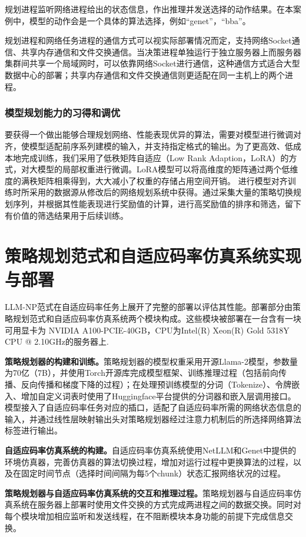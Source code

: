 规划进程监听网络进程给出的状态信息，作出推理并发送选择的动作结果。在本案例中，模型的动作会是一个具体的算法选择，例如“genet”，“bba”。

规划进程和网络任务进程的通信方式可以视实际部署情况而定，支持网络Socket通信、共享内存通信和文件交换通信。当决策进程单独运行于独立服务器上而服务器集群间共享一个局域网时，可以依靠网络Socket进行通信，这种通信方式适合大型数据中心的部署；共享内存通信和文件交换通信则更适配在同一主机上的两个进程。

\subsubsection{模型规划能力的习得和调优}
要获得一个做出能够合理规划网络、性能表现优异的算法，需要对模型进行微调对齐，使模型适配前序系列建模的输入，并支持指定格式的输出。为了更高效、低成本地完成训练，我们采用了低秩矩阵自适应（Low Rank Adaption，LoRA）的方式，对大模型的局部权重进行微调。LoRA模型可以将高维度的矩阵通过两个低维度的满秩矩阵相乘得到，大大减小了权重的存储占用空间开销。 进行模型对齐训练时所采用的数据源从修改后的网络规划系统中获得。通过采集大量的策略切换规划序列，并根据其性能表现进行奖励值的计算，进行高奖励值的排序和筛选，留下有价值的筛选结果用于后续训练。


\section{策略规划范式和自适应码率仿真系统实现与部署}
LLM-NP范式在自适应码率任务上展开了完整的部署以评估其性能。部署部分由策略规划范式和自适应码率仿真系统两个模块构成。这些模块被部署在一台含有一块可用显卡为 NVIDIA A100-PCIE-40GB，CPU为Intel(R) Xeon(R) Gold 5318Y CPU @ 2.10GHz的服务器上.

\textbf{策略规划器的构建和训练。}策略规划器的模型权重采用开源Llama-2模型，参数量为70亿（7B），并使用Torch开源库完成模型框架、训练推理过程（包括前向传播、反向传播和梯度下降的过程）；在处理预训练模型的分词（Tokenize）、令牌嵌入、增加自定义词表时使用了Huggingface平台提供的分词器和嵌入层调用接口。模型接入了自适应码率任务对应的插口，适配了自适应码率所需的网络状态信息的输入，并通过线性层映射输出头对策略规划器经过注意力机制后的所选择网络算法标签进行输出。

\textbf{自适应码率仿真系统的构建。}自适应码率仿真系统使用NetLLM\cite{wu2024netllm}和Genet\cite{xia2022genet}中提供的环境仿真器，完善仿真器的算法切换过程，增加对运行过程中更换算法的过程，以及在固定时间节点（选择时间间隔为每5个chunk）状态汇报网络状况的过程。


\textbf{策略规划器与自适应码率仿真系统的交互和推理过程。}策略规划器与自适应码率仿真系统在服务器上部署时使用文件交换的方式完成两进程之间的数据交换。同时对每个模块增加相应监听和发送线程，在不阻断模块本身功能的前提下完成信息交换。

